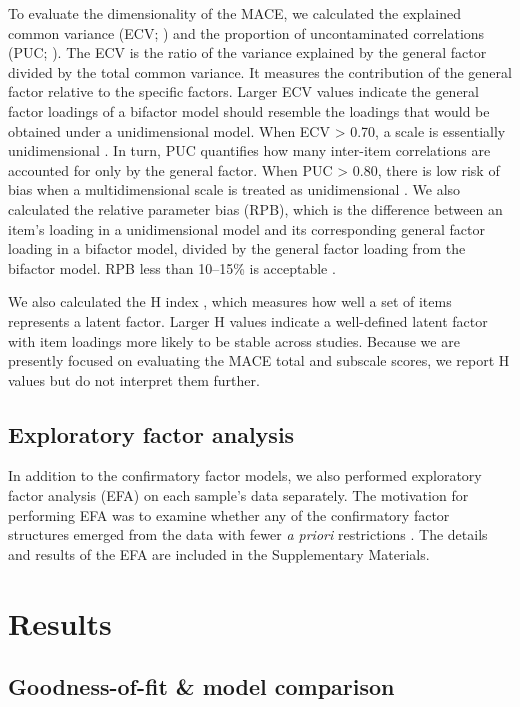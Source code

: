 \documentclass[letterpaper,man,natbib,longtable,floatsintext,12pt]{apa6}
\begin{document}
To evaluate the dimensionality of the MACE, we calculated the explained common variance (ECV; \citealt{sijtsma2009use}) and the proportion of uncontaminated correlations (PUC; \citealt{reise2013multidimensionality}). The ECV is the ratio of the variance explained by the general factor divided by the total common variance. It measures the contribution of the general factor relative to the specific factors. Larger ECV values indicate the general factor loadings of a bifactor model should resemble the loadings that would be obtained under a unidimensional model. When ECV > 0.70, a scale is essentially unidimensional \citep{rodriguez2016applying}. In turn, PUC quantifies how many inter-item correlations are accounted for only by the general factor. When PUC > 0.80, there is low risk of bias when a multidimensional scale is treated as unidimensional \citep{reise2013multidimensionality}. We also calculated the relative parameter bias (RPB), which is the difference between an item's loading in a unidimensional model and its corresponding general factor loading in a bifactor model, divided by the general factor loading from the bifactor model. RPB less than 10–15\% is acceptable \citep{muthen1987structural}.

We also calculated the H index \citep{hancock2001rethinking}, which measures how well a set of items represents a latent factor. Larger H values indicate a well-defined latent factor with item loadings more likely to be stable across studies. Because we are presently focused on evaluating the MACE total and subscale scores, we report H values but do not interpret them further.

\subsection{Exploratory factor analysis}

In addition to the confirmatory factor models, we also performed exploratory factor analysis (EFA) on each sample's data separately. The motivation for performing EFA was to examine whether any of the confirmatory factor structures emerged from the data with fewer \textit{a priori} restrictions \citep{schmitt2018selecting}. The details and results of the EFA are included in the Supplementary Materials. 

\section{Results}

\subsection{Goodness-of-fit \& model comparison}
\end{document}
